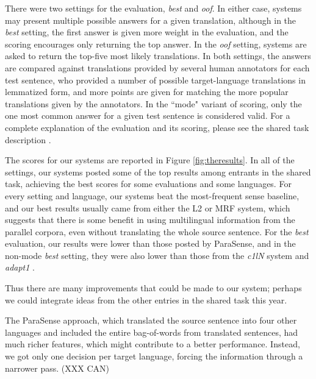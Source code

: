 \documentclass[11pt,letterpaper]{article}
\begin{document}
There were two settings for the evaluation, \emph{best} and \emph{oof}. In
either case, systems may present multiple possible answers for a given
translation, although in the \emph{best} setting, the first answer is given
more weight in the evaluation, and the scoring encourages only returning the
top answer. In the \emph{oof} setting, systems are asked to return the top-five
most likely translations. In both settings, the answers are compared against
translations provided by several human annotators for each test sentence, who
provided a number of possible target-language translations in lemmatized form,
and more points are given for matching the more popular translations given by
the annotators. In the ``mode" variant of scoring, only the one most common
answer for a given test sentence is considered valid. For a complete
explanation of the evaluation and its scoring, please see the shared task
description \cite{task10}. 

The scores for our systems are reported in Figure \ref{fig:theresults}. In all
of the settings, our systems posted some of the top results among entrants in
the shared task, achieving the best scores for some evaluations and some
languages.  For every setting and language, our systems beat the most-frequent
sense baseline, and our best results usually came from either the L2 or MRF
system, which suggests that there is some benefit in using multilingual
information from the parallel corpora, even without translating the whole
source sentence.
For the \emph{best} evaluation, our results were
lower than those posted by ParaSense, and in the non-mode \emph{best} setting,
they were also lower than those from the \emph{c1lN} system \cite{maarten} and
\emph{adapt1} \cite{marine}.

Thus there are many improvements that could be made to our system; perhaps we
could integrate ideas from the other entries in the shared task this year.

The ParaSense approach, which translated the source sentence into four other languages
and included the entire bag-of-words from translated sentences, had much richer features,
which might contribute to a better performance.
Instead, we got only one decision per target language, forcing the information through a narrower pass.
(XXX CAN)
\end{document}

